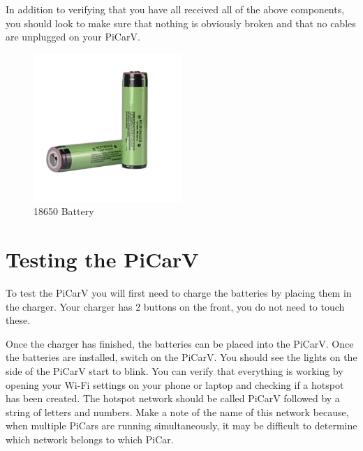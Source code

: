 \documentclass[11pt]{report}
\begin{document}
    In addition to verifying that you have all received all of the above components, you should look to make sure that nothing is obviously broken and that no cables are unplugged on your PiCarV.

\begin {figure}[h]
    \centering
    \includegraphics[width=0.5\textwidth]{battery.jpg}
    \caption{18650 Battery}
    \label{fig: 18650 Battery}
\end{figure}
    

\section{Testing the PiCarV}
To test the PiCarV you will first need to charge the batteries by placing them in the charger. Your charger has 2 buttons on the front, you do not need to touch these.


Once the charger has finished, the batteries can be placed into the PiCarV. Once the batteries are installed, switch on the PiCarV. You should see the lights on the side of the PiCarV start to blink. You can verify that everything is working by opening your Wi-Fi settings on your phone or laptop and checking if a hotspot has been created. The hotspot network should be called PiCarV followed by a string of letters and numbers. Make a note of the name of this network because, when multiple PiCars are running simultaneously, it may be difficult to determine which network belongs to which PiCar.
\end{document}
